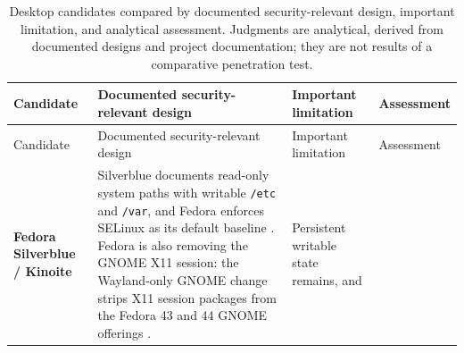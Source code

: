 \documentclass[
  english,
  9pt,
]{extarticle}
\begin{document}
\begin{longtable}[]{@{}
  >{\raggedright\arraybackslash}p{}
  >{\raggedright\arraybackslash}p{}
  >{\raggedright\arraybackslash}p{}
  >{\raggedright\arraybackslash}p{}@{}}
\caption{Desktop candidates compared by documented security-relevant
design, important limitation, and analytical assessment. Judgments are
analytical, derived from documented designs and project documentation;
they are not results of a comparative penetration
test.}\label{tbl:desktops}\tabularnewline
\toprule\noalign{}
\begin{minipage}[b]{\linewidth}\raggedright
Candidate
\end{minipage} & \begin{minipage}[b]{\linewidth}\raggedright
Documented security-relevant design
\end{minipage} & \begin{minipage}[b]{\linewidth}\raggedright
Important limitation
\end{minipage} & \begin{minipage}[b]{\linewidth}\raggedright
Assessment
\end{minipage} \\
\midrule\noalign{}
\endfirsthead
\toprule\noalign{}
\begin{minipage}[b]{\linewidth}\raggedright
Candidate
\end{minipage} & \begin{minipage}[b]{\linewidth}\raggedright
Documented security-relevant design
\end{minipage} & \begin{minipage}[b]{\linewidth}\raggedright
Important limitation
\end{minipage} & \begin{minipage}[b]{\linewidth}\raggedright
Assessment
\end{minipage} \\
\midrule\noalign{}
\endhead
\bottomrule\noalign{}
\endlastfoot
\textbf{Fedora Silverblue / Kinoite} & Silverblue documents read-only
system paths with writable \texttt{/etc} and \texttt{/var}, and Fedora
enforces SELinux as its default baseline
\citep{fedora_silverblue_technical, fedora_selinux_config}. Fedora is
also removing the GNOME X11 session: the Wayland-only GNOME change
strips X11 session packages from the Fedora 43 and 44 GNOME offerings
\citep{fedora_wayland_only}. & Persistent writable state remains, and

\end{longtable}
\end{document}
